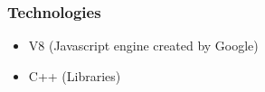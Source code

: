 \begin{frame}
	\frametitle{Technologies}
	\begin{itemize}[<+-| highlight@+>]
		\item V8 (Javascript engine created by Google)
		\item C++ (Libraries)
	\end{itemize}
\end{frame}


